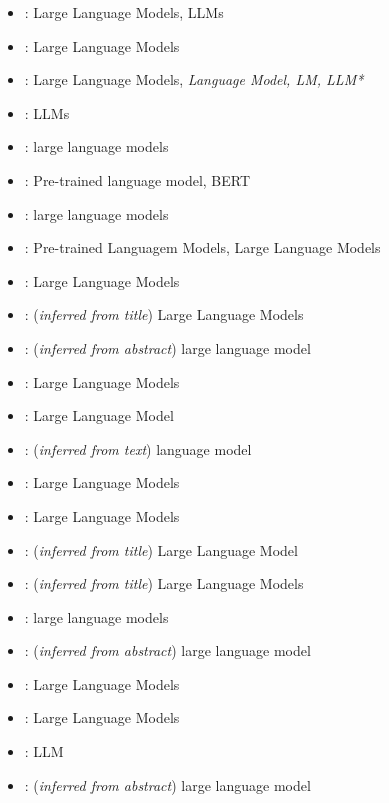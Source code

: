 \documentclass[a4paper,colorinlistoftodos]{article}
\begin{document}
\begin{itemize}
  \item \citet{babaei2023Llms4olLargeLanguage}: Large Language Models, LLMs
  \item \citet{babaei2025Llms4omMatchingOntologies}: Large Language Models
  \item \citet{li2025LargeLanguageModels}: Large Language Models,
    \textit{Language Model, LM, LLM*}
  \item \citet{mai2024DoLlmsReally}: LLMs
  \item \citet{bakker2024OntologyLearningText}: large language models
  \item \citet{chen2023ContextualSemanticEmbeddings}: Pre-trained language
    model, BERT
  \item \citet{chen2023PromptingOrFine}: large language models
  \item \citet{dong2024LanguageModelBased}: Pre-trained Languagem Models,
    Large Language Models
  \item \citet{doumanas2024IntegratingLlmsIn}: Large Language Models
  \item \citet{du2024ShortReviewOntology}: (\textit{inferred from title})
    Large Language Models 
  \item \citet{funk2023TowardsOntologyConstruction}: (\textit{inferred from
      abstract}) large language model
  \item \citet{garijo2024LlmsOntologyEngineering}: Large Language Models
  \item \citet{he2023ExploringLargeLanguage}: Large Language Model
  \item \citet{jain2022DistillingHypernymyRelations}: (\textit{inferred from
      text}) language model
  \item \citet{kommineni2024HumanExpertsMachines}: Large Language Models
  \item \citet{lippolis2025OntologyGenerationUsing}: Large Language Models
  \item \citet{lo2024EndEndOntology}: (\textit{inferred from title}) Large
    Language Model
  \item \citet{mateiu2023OntologyEngineeringWith}: (\textit{inferred from
      title}) Large Language Models
  \item \citet{norouzi2024OntologyPopulationUsing}: large language models
  \item \citet{snijder2024AdvancingOntologyAlignment}: (\textit{inferred from
      abstract}) large language model
  \item \citet{fathallah2024NeonGptLarge}: Large Language Models
  \item \citet{tsaneva2024LlmDrivenOntology}: Large Language Models
  \item \citet{yang2024LlmSupportedApproach}: LLM
  \item \citet{zeginis2024ApplyingOntologyAware}: (\textit{inferred from
      abstract}) large language model
\end{itemize}
\end{document}
